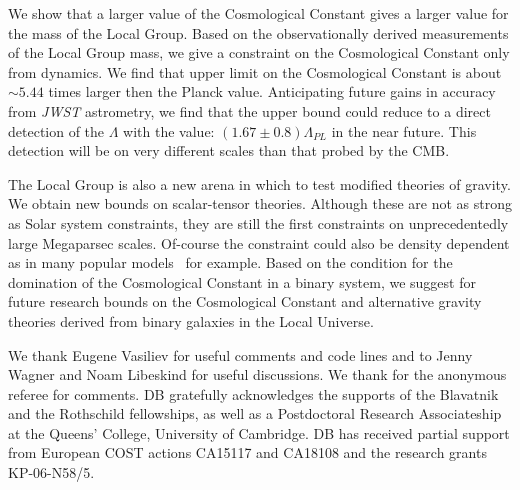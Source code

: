 We show that a larger value of the Cosmological Constant gives a larger value for the mass of the Local Group. Based on the observationally derived measurements of the Local Group mass, we give a constraint on the Cosmological Constant only from dynamics.  {We find that upper limit on the Cosmological Constant is about $\sim 5.44$ times larger then the Planck value. Anticipating future gains in accuracy from {\it JWST} astrometry, we find that the upper bound could reduce to a direct detection of the $\Lambda$ with the value: $\left(1.67 \pm 0.8 \right) \Lambda_{PL}$ in the near future. This detection will be on very different scales than that probed by the CMB.}

The Local Group is also a new arena in which to test modified theories of gravity. We obtain new bounds on scalar-tensor theories. Although these are not as strong as Solar system constraints, they are still the first constraints on unprecedentedly large Megaparsec scales. Of-course the constraint could also be density dependent as in many popular models~\citep{Brax:2008hh} for example. Based on the condition for the domination of the Cosmological Constant in a binary system, we suggest for future research bounds on the Cosmological Constant and alternative gravity theories derived from binary galaxies in the Local Universe.  


\begin{acknowledgments}
We thank Eugene Vasiliev for useful comments and code lines and to Jenny Wagner and Noam Libeskind for useful discussions.  {We thank for the anonymous referee for comments.}  DB gratefully acknowledges the supports of the Blavatnik and the Rothschild fellowships, as well as a Postdoctoral Research Associateship at the Queens' College, University of Cambridge. DB has received partial support from European COST actions CA15117 and CA18108 and the research grants KP-06-N58/5.
\end{acknowledgments}



{}






